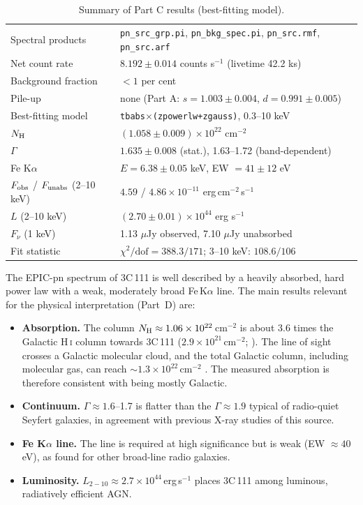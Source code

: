 \documentclass[11pt,a4paper]{article}
\newcommand{\nh}{N_{\rm H}}
\newcommand{\cgs}{erg\,cm$^{-2}$\,s$^{-1}$}
\begin{document}
\begin{table}[H]
\centering
\caption{Summary of Part C results (best-fitting model).}
\label{tab:summary}
\begin{tabular}{ll}
\toprule
Spectral products & \texttt{pn\_src\_grp.pi}, \texttt{pn\_bkg\_spec.pi}, \texttt{pn\_src.rmf}, \texttt{pn\_src.arf} \\
Net count rate & $8.192\pm0.014$ counts s$^{-1}$ (livetime 42.2 ks) \\
Background fraction & $<1$ per cent \\
Pile-up & none (Part A: $s=1.003\pm0.004$, $d=0.991\pm0.005$) \\
Best-fitting model & \texttt{tbabs$\times$(zpowerlw+zgauss)}, 0.3--10 keV \\
$\nh$ & $(1.058\pm0.009)\times10^{22}$ cm$^{-2}$ \\
$\Gamma$ & $1.635\pm0.008$ (stat.), 1.63--1.72 (band-dependent) \\
Fe K$\alpha$ & $E=6.38\pm0.05$ keV, EW $=41\pm12$ eV \\
$F_{\rm obs}$ / $F_{\rm unabs}$ (2--10 keV) & $4.59$ / $4.86\times10^{-11}$ \cgs \\
$L$ (2--10 keV) & $(2.70\pm0.01)\times10^{44}$ erg s$^{-1}$ \\
$F_\nu$ (1 keV) & 1.13 $\mu$Jy observed, 7.10 $\mu$Jy unabsorbed \\
Fit statistic & $\chi^2/\mathrm{dof}=388.3/171$; 3--10 keV: $108.6/106$ \\
\bottomrule
\end{tabular}
\end{table}

The EPIC-pn spectrum of 3C\,111 is well described by a heavily absorbed, hard power law with a weak, moderately broad Fe\,K$\alpha$ line. The main results relevant for the physical interpretation (Part~D) are:

\begin{itemize}
\item \textbf{Absorption.} The column $\nh\approx1.06\times10^{22}$\,cm$^{-2}$ is about 3.6 times the Galactic H\,\textsc{i} column towards 3C\,111 ($2.9\times10^{21}$\,cm$^{-2}$; \citealt{kalberla05}). The line of sight crosses a Galactic molecular cloud, and the total Galactic column, including molecular gas, can reach $\sim1.3\times10^{22}$\,cm$^{-2}$ \citep{ballo11,tombesi17}. The measured absorption is therefore consistent with being mostly Galactic.
\item \textbf{Continuum.} $\Gamma\approx1.6$--1.7 is flatter than the $\Gamma\approx1.9$ typical of radio-quiet Seyfert galaxies, in agreement with previous X-ray studies of this source.
\item \textbf{Fe K$\alpha$ line.} The line is required at high significance but is weak (EW $\approx40$\,eV), as found for other broad-line radio galaxies.
\item \textbf{Luminosity.} $L_{2-10}\approx2.7\times10^{44}$\,erg\,s$^{-1}$ places 3C\,111 among luminous, radiatively efficient AGN.
\end{itemize}
\end{document}
